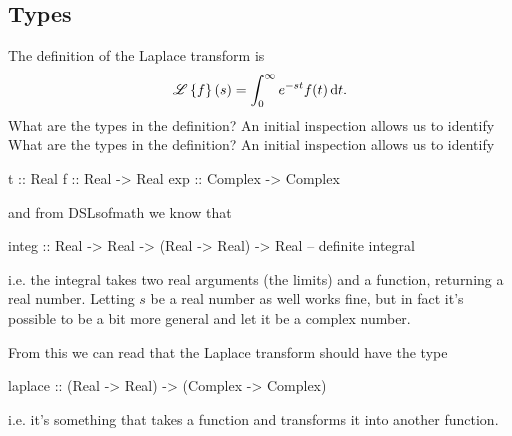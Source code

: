 \subsection{Types} 
The definition of the Laplace transform is  
\begin{equation*}
    \Lplc \left\{f\right\}(s) = \int_0^\infty e^{-st} f(t) \, \dd t. %
\end{equation*}
What are the types in the definition? An initial inspection allows us to identify
What are the types in the definition? An initial inspection allows us to identify
\begin{code}
t   :: Real 
f   :: Real -> Real 
exp :: Complex -> Complex 
\end{code}
and from DSLsofmath we know that 
\begin{code}
integ :: Real -> Real -> (Real -> Real) -> Real -- definite integral \end{code}%
i.e. the integral takes two real arguments (the limits) and a function, returning a real number. 
Letting $s$ be a real number as well works fine, but in fact it's possible to be a bit more general and let it be a complex number. 

From this we can read that the Laplace transform should have the type
\begin{code}
laplace :: (Real -> Real) -> (Complex -> Complex) 
\end{code}
i.e. it's something that takes a function and transforms it into another function. 



